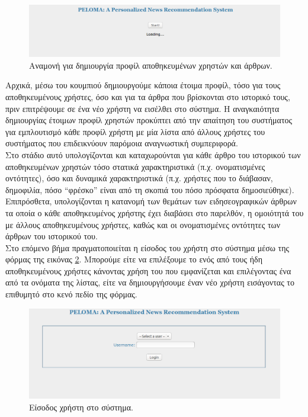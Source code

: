 \begin{figure}[!ht] \centering
\centerline{
    \includegraphics[scale=0.46]{static/figures/peloma/loading.png}}
    \caption{Αναμονή για δημιουργία προφίλ αποθηκευμένων χρηστών και άρθρων.}
    \label{}
\end{figure} 

Αρχικά, μέσω του κουμπιού {} δημιουργούμε κάποια έτοιμα προφίλ, 
τόσο για τους αποθηκευμένους χρήστες, όσο και για τα άρθρα που βρίσκονται στο ιστορικό τους, 
πριν επιτρέψουμε σε ένα νέο χρήστη να εισέλθει στο σύστημα. 
Η αναγκαιότητα δημιουργίας έτοιμων προφίλ χρηστών προκύπτει από την απαίτηση του συστήματος για εμπλουτισμό 
κάθε προφίλ χρήστη με μία λίστα από άλλους χρήστες του συστήματος που επιδεικνύουν παρόμοια αναγνωστική συμπεριφορά. \\
Στο στάδιο αυτό υπολογίζονται και καταχωρούνται για κάθε άρθρο του ιστορικού των αποθηκευμένων χρηστών 
τόσο στατικά χαρακτηριστικά (π.χ. ονοματισμένες οντότητες), 
όσο και δυναμικά χαρακτηριστικά (π.χ. χρήστες που το διάβασαν, δημοφιλία, 
πόσο “φρέσκο” είναι από τη σκοπιά του πόσο πρόσφατα δημοσιεύθηκε).\\
Επιπρόσθετα, υπολογίζονται η κατανομή των θεμάτων των ειδησεογραφικών άρθρων 
τα οποία ο κάθε αποθηκευμένος χρήστης έχει διαβάσει στο παρελθόν, 
η ομοιότητά του με άλλους αποθηκευμένους χρήστες, καθώς και οι ονοματισμένες οντότητες των άρθρων του ιστορικού του.  \\

\newpage
Στο επόμενο βήμα πραγματοποιείται η είσοδος του χρήστη στο σύστημα μέσω της φόρμας της εικόνας \ref{fig:inter01}. 
Μπορούμε είτε να επιλέξουμε το {} ενός από τους ήδη αποθηκευμένους χρήστες 
κάνοντας χρήση του {} που εμφανίζεται και επιλέγοντας ένα από τα ονόματα της λίστας, 
είτε να δημιουργήσουμε έναν νέο χρήστη εισάγοντας το επιθυμητό {} στο κενό πεδίο της φόρμας. \\

\begin{figure}[!ht] \centering
\centerline{
    \includegraphics[scale=0.5]{static/figures/peloma/login.png}}
    \caption{Είσοδος χρήστη στο σύστημα.}
    \label{fig:inter01}
\end{figure} 

